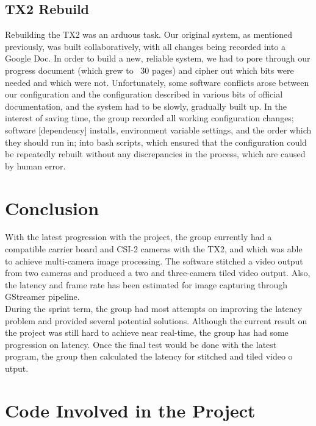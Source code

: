 \documentclass[letterpaper,10pt,serif,draftclsnofoot,onecolumn,compsoc,titlepage]{IEEEtran}
\begin{document}
\subsection{TX2 Rebuild}
Rebuilding the TX2 was an arduous task. Our original system, as mentioned previously, 
was built collaboratively, with all changes being recorded into a Google Doc. In order 
to build a new, reliable system, we had to pore through our progress document 
(which grew to ~30 pages) and cipher out which bits were needed and which were not. 
Unfortunately, some software conflicts arose between our configuration and the 
configuration described in various bits of official documentation, and the system had 
to be slowly, gradually built up. In the interest of saving time, the group recorded all 
working configuration changes; software [dependency] installs, environment variable 
settings, and the order which they should run in; into bash scripts, which ensured that 
the configuration could be repeatedly rebuilt without any discrepancies in the process, 
which are caused by human error.

\section{Conclusion}

With the latest progression with the project, the group currently had a compatible carrier board 
and CSI-2 cameras with the TX2, and which was able to achieve multi-camera image processing. The 
software stitched a video output from two cameras and produced a two and three-camera tiled video 
output. Also, the latency and frame rate has been estimated for image capturing through GStreamer 
pipeline. \\

During the sprint term, the group had most attempts on improving the latency problem and provided 
several potential solutions. Although the current result on the project was still hard to achieve 
near real-time, the group has had some progression on latency. Once the final test would be done 
with the latest program, the group then calculated the latency for stitched and tiled video o
utput. \\

\section{Code Involved in the Project}
\end{document}

